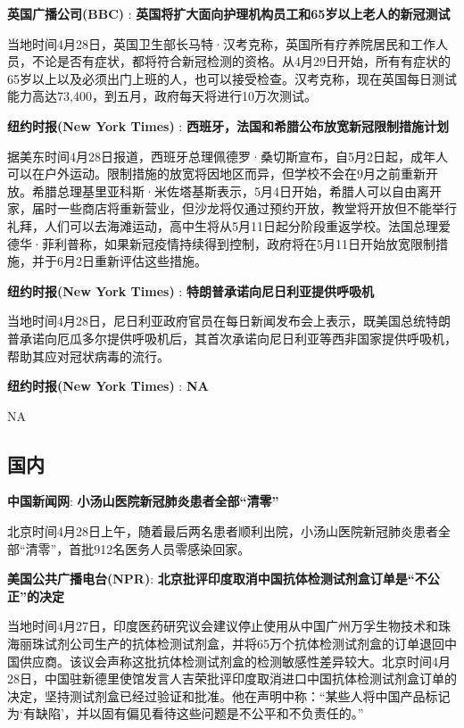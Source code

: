 \documentclass[
]{article}
\begin{document}
\textbf{\textcolor{glaucous}{英国广播公司(BBC)}} :
\textbf{英国将扩大面向护理机构员工和65岁以上老人的新冠测试}

当地时间4月28日，英国卫生部长马特·汉考克称，英国所有疗养院居民和工作人员，不论是否有症状，都将符合新冠检测的资格。从4月29日开始，所有有症状的65岁以上以及必须出门上班的人，也可以接受检查。汉考克称，现在英国每日测试能力高达73,400，到五月，政府每天将进行10万次测试。

\textbf{\textcolor{glaucous}{纽约时报(New York Times)}} :
\textbf{西班牙，法国和希腊公布放宽新冠限制措施计划 }

据美东时间4月28日报道，西班牙总理佩德罗·桑切斯宣布，自5月2日起，成年人可以在户外运动。限制措施的放宽将因地区而异，但学校不会在9月之前重新开放。希腊总理基里亚科斯·米佐塔基斯表示，5月4日开始，希腊人可以自由离开家，届时一些商店将重新营业，但沙龙将仅通过预约开放，教堂将开放但不能举行礼拜，人们可以去海滩运动，高中生将从5月11日起分阶段重返学校。法国总理爱德华·菲利普称，如果新冠疫情持续得到控制，政府将在5月11日开始放宽限制措施，并于6月2日重新评估这些措施。

\textbf{\textcolor{glaucous}{纽约时报(New York Times)}} :
\textbf{特朗普承诺向尼日利亚提供呼吸机 }

当地时间4月28日，尼日利亚政府官员在每日新闻发布会上表示，既美国总统特朗普承诺向厄瓜多尔提供呼吸机后，其首次承诺向尼日利亚等西非国家提供呼吸机，帮助其应对冠状病毒的流行。

\textbf{\textcolor{glaucous}{纽约时报(New York Times)}} : \textbf{NA}

NA

\vspace{-5mm}

\hypertarget{section-1}{%
\subsection{\texorpdfstring{\textcolor{glaucous}{\Huge 国内}}{}}\label{section-1}}

\vspace{-3mm}

\textbf{\textcolor{glaucous}{中国新闻网}}:
\textbf{小汤山医院新冠肺炎患者全部``清零'' }

北京时间4月28日上午，随着最后两名患者顺利出院，小汤山医院新冠肺炎患者全部``清零''，首批912名医务人员零感染回家。

\textbf{\textcolor{glaucous}{美国公共广播电台(NPR)}}:
\textbf{北京批评印度取消中国抗体检测试剂盒订单是``不公正''的决定}

当地时间4月27日，印度医药研究议会建议停止使用从中国广州万孚生物技术和珠海丽珠试剂公司生产的抗体检测试剂盒，并将65万个抗体检测试剂盒的订单退回中国供应商。该议会声称这批抗体检测试剂盒的检测敏感性差异较大。北京时间4月28日，中国驻新德里使馆发言人吉荣批评印度取消进口中国抗体检测试剂盒订单的决定，坚持测试剂盒已经过验证和批准。他在声明中称：``某些人将中国产品标记为`有缺陷'，并以固有偏见看待这些问题是不公平和不负责任的。''
\end{document}
